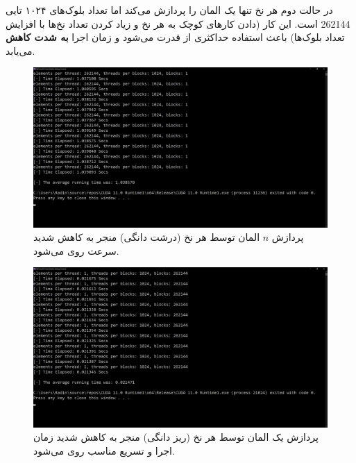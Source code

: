\documentclass{HW}
\begin{document}
 در حالت دوم هر نخ تنها یک المان را پردازش می‌کند اما تعداد بلوک‌های ۱۰۲۴ تایی 262144 است. این کار (دادن کارهای کوچک به هر نخ و زیاد کردن تعداد نخ‌ها با افزایش تعداد بلوک‌ها) باعث استفاده حداکثری از قدرت  می‌شود و زمان اجرا \textbf{به شدت کاهش} می‌یابد.
 
\begin{figure}[ht!]
\begin{center}
	\includegraphics[width=15cm]{images/gpu-coarse}
\end{center}
\caption{پردازش
$n$
المان توسط هر نخ (درشت دانگی) منجر به کاهش شدید سرعت روی
می‌شود.}
\label{fig:gpu-coarse}
\end{figure}

\begin{figure}[ht!]
\begin{center}
	\includegraphics[width=15cm]{images/gpu-fine}
\end{center}
\caption{پردازش یک المان توسط هر نخ (ریز دانگی) منجر به کاهش شدید زمان اجرا و تسریع مناسب روی
می‌شود.}
\label{fig:gpu-fine}
\end{figure}
\end{document}
